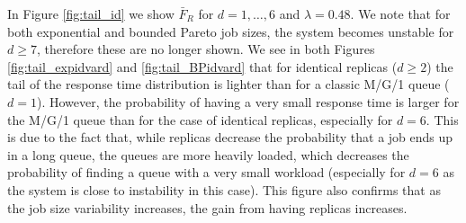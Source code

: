 \documentclass[12pt]{report}
\begin{document}
In Figure \ref{fig:tail_id} we show $\bar F_R$ for $d=1,\dots,6$ and $\lambda=0.48$. We note that for both exponential and bounded Pareto job sizes, the system becomes unstable for $d\geq 7$, therefore these are no longer shown. We see in both Figures \ref{fig:tail_expidvard} and \ref{fig:tail_BPidvard} that for identical replicas ($d\geq 2$) the tail of the response time distribution is lighter than for a classic M/G/1 queue ($d=1$). However, the probability of having a very small response time is larger for the M/G/1 queue than for the case of identical replicas, especially for $d=6$. This is due to the fact that, while replicas decrease the probability that a job ends up in a long queue, the queues are more heavily loaded, which decreases the probability of finding a queue with a very small workload (especially for $d=6$ as the system is close to instability in this case). This figure also confirms that as the job size variability increases, the gain from having replicas increases.
\end{document}
